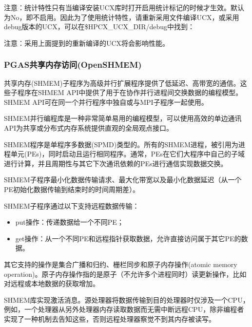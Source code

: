 \documentclass[a4paper,12pt,english]{sphinxmanual}
\begin{document}
\begin{itemize}
\sphinxAtStartPar
注意：统计特性只有当编译安装UCX库时打开启用统计标记的时候才生效。默认为No，即不启用。因此为了使用统计特性，请重新采用文件编译UCX，或采用debug版本的UCX，可以在\$HPCX\_UCX\_DIR/debug中找到：

\sphinxAtStartPar
{}

\sphinxAtStartPar
注意：采用上面提到的重新编译的UCX将会影响性能。

\end{itemize}


\subsubsection{PGAS共享内存访问(OpenSHMEM)}
\label{\detokenize{mpi-application/mpi-application:pgas-openshmem}}
\sphinxAtStartPar
共享内存(SHMEM)子程序为高级并行扩展程序提供了低延迟、高带宽的通信。这些子程序在SHMEM
API中提供了用于在协作并行进程间交换数据的编程模型。SHMEM
API可在同一个并行程序中独自或与MPI子程序一起使用。

\sphinxAtStartPar
SHMEM并行编程库是一种非常简单易用的编程模型，可以使用高效的单边通讯API为共享或分布式内存系统提供直观的全局观点接口。

\sphinxAtStartPar
SHMEM程序是单程序多数据(SPMD)类型的。所有的SHMEM进程，被引用为进程单元(PEs)，同时启动且运行相同程序。通常，PEs在它们大程序中自己的子域进行计算，并且周期性与其它下次通讯依赖的PEs进行通信实现数据交换。

\sphinxAtStartPar
SHMEM子程序最小化数据传输请求、最大化带宽以及最小化数据延迟（从一个PE初始化数据传输到结束时的时间周期差）。

\sphinxAtStartPar
SHMEM子程序通过以下支持远程数据传输：
\begin{itemize}
\item {} 
\sphinxAtStartPar
put操作：传递数据给一个不同PE；

\item {} 
\sphinxAtStartPar
get操作：从一个不同PE和远程指针获取数据，允许直接访问属于其它PE的数据。

\end{itemize}

\sphinxAtStartPar
其它支持的操作是集合广播和归约、栅栏同步和原子内存操作(atomic memory
operation)。原子内存操作指的是原子（不允许多个进程同时）读\sphinxhyphen{}更新操作，比如对远程或本地数据的获取\sphinxhyphen{}增加。

\sphinxAtStartPar
SHMEM库实现激活消息。源处理器将数据传输到目的处理器时仅涉及一个CPU，例如，一个处理器从另外处理器内存读取数据而无需中断远程CPU，除非编程者实现了一种机制去告知这些，否则远程处理器察觉不到其内存被读写。
\end{document}
